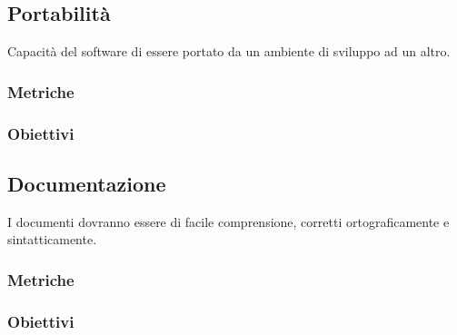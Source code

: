\subsection{Portabilità}
Capacità del software di essere portato da un ambiente di sviluppo ad un altro.
\subsubsection{Metriche}
\subsubsection{Obiettivi}

\subsection{Documentazione}
I documenti dovranno essere di facile comprensione, corretti ortograficamente e sintatticamente.
\subsubsection{Metriche}
\subsubsection{Obiettivi}


